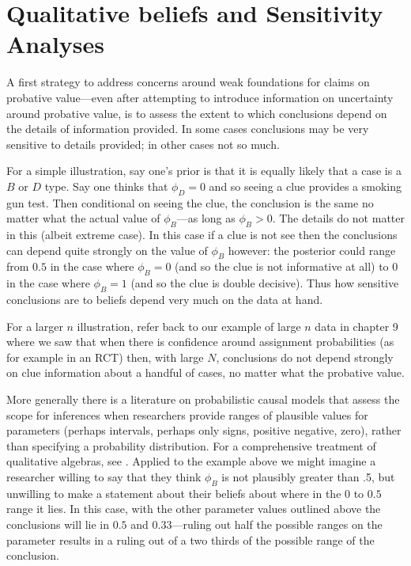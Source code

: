 \documentclass[12pt,]{book}
\begin{document}
\hypertarget{qualitative-beliefs-and-sensitivity-analyses}{%
\section{Qualitative beliefs and Sensitivity Analyses}\label{qualitative-beliefs-and-sensitivity-analyses}}

A first strategy to address concerns around weak foundations for claims on probative value---even after attempting to introduce information on uncertainty around probative value, is to assess the extent to which conclusions depend on the details of information provided. In some cases conclusions may be very sensitive to details provided; in other cases not so much.

For a simple illustration, say one's prior is that it is equally likely that a case is a \(B\) or \(D\) type. Say one thinks that \(\phi_D=0\) and so seeing a clue provides a smoking gun test. Then conditional on seeing the clue, the conclusion is the same no matter what the actual value of \(\phi_B\)---as long as \(\phi_B>0\). The details do not matter in this (albeit extreme case). In this case if a clue is not see then the conclusions can depend quite strongly on the value of \(\phi_B\) however: the posterior could range from \(0.5\) in the case where \(\phi_B=0\) (and so the clue is not informative at all) to \(0\) in the case where \(\phi_B = 1\) (and so the clue is double decisive). Thus how sensitive conclusions are to beliefs depend very much on the data at hand.

For a larger \(n\) illustration, refer back to our example of large \(n\) data in chapter 9 where we saw that when there is confidence around assignment probabilities (as for example in an RCT) then, with large \(N\), conclusions do not depend strongly on clue information about a handful of cases, no matter what the probative value.

More generally there is a literature on probabilistic causal models that assess the scope for inferences when researchers provide ranges of plausible values for parameters (perhaps intervals, perhaps only signs, positive negative, zero), rather than specifying a probability distribution. For a comprehensive treatment of qualitative algebras, see \citet{parsons2001qualitative}. Applied to the example above we might imagine a researcher willing to say that they think \(\phi_B\) is not plausibly greater than .5, but unwilling to make a statement about their beliefs about where in the \(0\) to \(0.5\) range it lies. In this case, with the other parameter values outlined above the conclusions will lie in \(0.5\) and \(0.33\)---ruling out half the possible ranges on the parameter results in a ruling out of a two thirds of the possible range of the conclusion.
\end{document}
